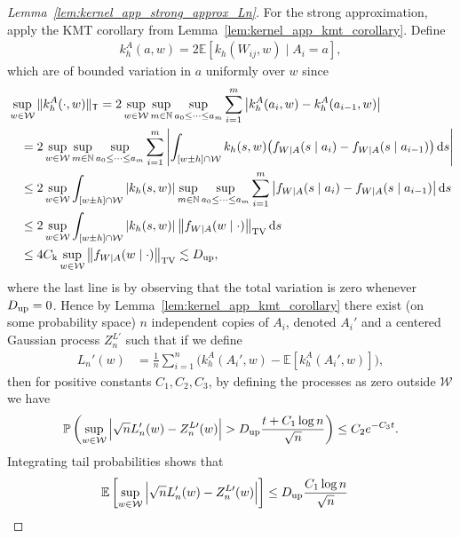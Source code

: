 \documentclass[11pt,lof]{puthesis}
\renewcommand{\P}{\ensuremath{\mathbb{P}}}
\newcommand{\N}{\ensuremath{\mathbb{N}}}
\newcommand{\E}{\ensuremath{\mathbb{E}}}
\newcommand{\rk}{\ensuremath{\mathrm{k}}}
\newcommand{\TV}{\mathrm{TV}}
\newcommand{\cW}{\ensuremath{\mathcal{W}}}
\newcommand{\T}{\ensuremath{\mathsf{T}}}
\newcommand{\Du}{\ensuremath{D_{\textup{up}}}}
\newcommand{\diff}[1]{\,\mathrm{d}#1}
\theoremstyle{break}
\theoremstyle{proof}
\newtheorem{proof}{Proof}
\begin{document}
\begin{proof}[Lemma~\ref{lem:kernel_app_strong_approx_Ln}]

For the strong approximation,
apply the KMT corollary from
Lemma~\ref{lem:kernel_app_kmt_corollary}.
Define
%
\begin{align*}
k_h^A(a, w) = 2\E[k_h(W_{i j},w) \mid A_i = a],
\end{align*}
%
which are of bounded variation in $a$ uniformly over $w$ since
%
\begin{align*}
&\sup_{w \in \cW} \|k_h^A(\cdot,w)\|_\T
= 2\sup_{w \in \cW}
\sup_{m \in \N}
\sup_{a_0 \leq \cdots \leq a_m}
\sum_{i=1}^m
\big|k_h^A(a_i,w) - k_h^A(a_{i-1},w)\big| \\
&\quad=
2\sup_{w \in \cW}
\sup_{m \in \N}
\sup_{a_0 \leq \cdots \leq a_m}
\sum_{i=1}^m
\left|
\int_{[w \pm h] \cap \cW}
k_h(s,w)
\big(
f_{W \mid A}(s \mid a_i)
- f_{W \mid A}(s \mid a_{i-1})
\big)
\diff{s}
\right| \\
&\quad\leq
2 \sup_{w \in \cW}
\int_{[w \pm h] \cap \cW}
|k_h(s,w)|
\sup_{m \in \N}
\sup_{a_0 \leq \cdots \leq a_m}
\sum_{i=1}^m
\big|
f_{W \mid A}(s \mid a_i)
- f_{W \mid A}(s \mid a_{i-1})
\big|
\diff{s} \\
&\quad\leq
2 \sup_{w \in \cW}
\int_{[w \pm h] \cap \cW}
|k_h(s,w)|
\,
\big\|
f_{W \mid A}(w \mid \cdot)
\big\|_\TV
\diff{s} \\
&\quad\leq
4 C_\rk \sup_{w \in \cW}
\big\|
f_{W \mid A}(w \mid \cdot)
\big\|_\TV
\lesssim
\Du,
\end{align*}
%
where the last line is by observing that the total variation
is zero whenever $\Du = 0$.
Hence by Lemma~\ref{lem:kernel_app_kmt_corollary}
there exist (on some probability space)
$n$ independent copies of $A_i$,
denoted $A_i'$
and a centered Gaussian process $Z_n^{L\prime}$
such that if we define
%
\begin{align*}
L_n'(w)
&=
\frac{1}{n}
\sum_{i=1}^n
\big(k_h^A(A_i',w) -
\E[k_h^A(A_i',w)]\big),
\end{align*}
%
then for positive constants
$C_1, C_2, C_3$,
by defining the processes as zero outside $\cW$
we have
%
\begin{align*}
\P\left(
\sup_{w \in \cW}
\Big|\sqrt{n} L_n'(w) - Z_n^{L\prime}(w)\Big|
> \Du \frac{t + C_1 \log n}{\sqrt n}
\right)
\leq C_2 e^{-C_3 t}.
\end{align*}
%
Integrating tail probabilities shows that
%
\begin{align*}
\E\left[
\sup_{w \in \cW}
\Big|\sqrt{n} L_n'(w) - Z_n^{L\prime}(w)\Big|
\right]
&\leq
\Du \frac{C_1 \log n}{\sqrt n}

\end{align*}
\end{proof}
\end{document}
